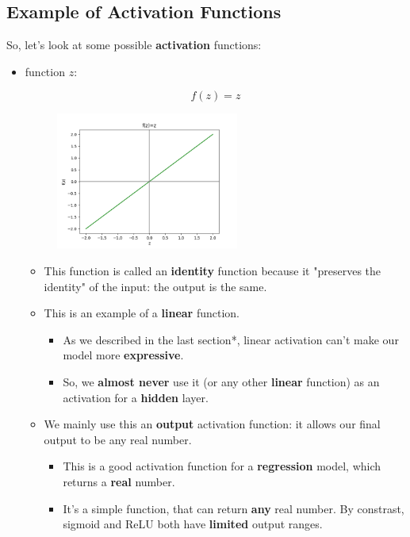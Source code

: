     \subsection*{Example of Activation Functions}
    
        So, let's look at some possible \textbf{activation} functions:
        
        \begin{itemize}
            \item {} function $z$:

                \begin{equation}
                    f(z) = z
                \end{equation}

                \begin{figure}[H]
                    \centering
                    \includegraphics[width=60mm,scale=0.4]{images/nn_images/identity_fn.png}
                \end{figure}
                

                \begin{itemize}
                    \item This function is called an \textbf{identity} function because it "preserves the identity" of the input: the output is the same.

                    \item This is an example of a \textbf{linear} function.
                        \begin{itemize}
                            \item As we described in the last section*, linear activation can't make our model more \textbf{expressive}.
                            \item So, we \textbf{almost never} use it (or any other \textbf{linear} function) as an activation for a \textbf{hidden} layer.
                        \end{itemize}
                    \item We mainly use this an \textbf{output} activation function: it allows our final output to be any real number.
                        \begin{itemize}
                            \item This is a good activation function for a \textbf{regression} model, which returns a \textbf{real} number.
                            \item It's a simple function, that can return \textbf{any} real number. By constrast, sigmoid and ReLU both have \textbf{limited} output ranges.
                        \end{itemize}
                \end{itemize}


\end{itemize}
